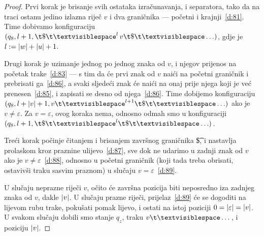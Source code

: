 \begin{proof}
Prvi korak je brisanje svih ostataka izračunavanja, i separatora, tako da na traci ostanu jedino izlazna riječ $v$ i dva graničnika --- početni i krajnji~\eqref{d:81}. Time dobivamo konfiguraciju $(q_8,l+1,\t\$\bl^l\,v\t\$\bl\ldots)$, gdje je $l:=\lvert w\rvert+\lvert u\rvert+1$.

Drugi korak je uzimanje jednog po jednog znaka od $v$, i njegov prijenos na početak trake~\eqref{d:83} --- s tim da će prvi znak od $v$ naići na početni graničnik i prebrisati ga~\eqref{d:86}, a svaki sljedeći znak će naići na onaj prije njega koji je već prenesen~\eqref{d:85}, i zapisati se desno od njega~\eqref{d:86}. Time dobijemo konfiguraciju $(q_8,l+\dulj v+1,v\bl^{l+1}\t\$\bl\ldots)$ ako je $v\not=\varepsilon$. Za $v=\varepsilon$, ovog koraka nema, odnosno odmah smo u konfiguraciji $(q_8,l+1,\t\$\bl^l\t\$\bl\ldots)$.

Treći korak počinje čitanjem i brisanjem završnog graničnika \t\$, i nastavlja prolaskom kroz praznine ulijevo~\eqref{d:87}, sve dok ne udarimo u zadnji znak od $v$ ako je $v\not=\varepsilon$~\eqref{d:88}, odnosno u početni graničnik (koji tada treba obrisati, ostavivši traku sasvim praznom) u slučaju $v=\varepsilon$~\eqref{d:89}.

U slučaju neprazne riječi $v$, očito će završna pozicija biti neposredno iza zadnjeg znaka od $v$, dakle $\lvert v\rvert$. U slučaju prazne riječi, prijelaz~\eqref{d:89} će se dogoditi na lijevom rubu trake, pokušati pomak lijevo, i ostati na istoj poziciji $0=\lvert\varepsilon\rvert=\lvert v\rvert$. U svakom slučaju dobili smo stanje $q_z$, traku $v\bl\ldots$\,, i poziciju $\lvert v\rvert$.
\end{proof}

